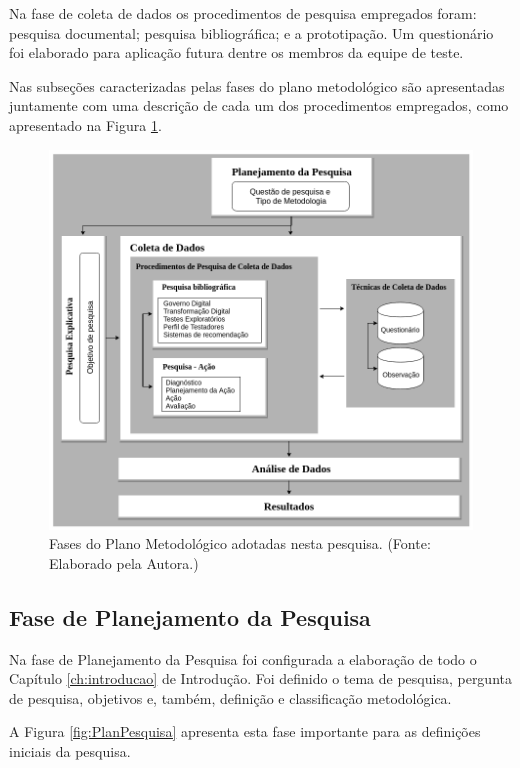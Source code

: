 Na fase de coleta de dados os procedimentos de pesquisa empregados foram: pesquisa documental; pesquisa bibliográfica; e a prototipação. Um questionário foi elaborado para aplicação futura dentre os membros da equipe de teste.

Nas subseções caracterizadas pelas fases do plano metodológico são apresentadas juntamente com uma descrição de cada um dos procedimentos empregados, como apresentado na Figura \ref{fig:fasesPlano}.


        \begin{figure}[H]
          \centering
          \includegraphics[width=16cm]{figuras/fasesPlanoMetodologico.png}
          \caption{Fases do Plano Metodológico adotadas nesta pesquisa. (Fonte: Elaborado pela Autora.)}
          \label{fig:fasesPlano}

        \end{figure}


\subsection{Fase de Planejamento da Pesquisa}

Na fase de Planejamento da Pesquisa foi configurada a elaboração de todo o Capítulo \ref{ch:introducao} de Introdução. Foi definido o tema de pesquisa, pergunta de pesquisa, objetivos e, também, definição e classificação metodológica.

A Figura \ref{fig:PlanPesquisa} apresenta esta fase importante para as definições iniciais da pesquisa.

